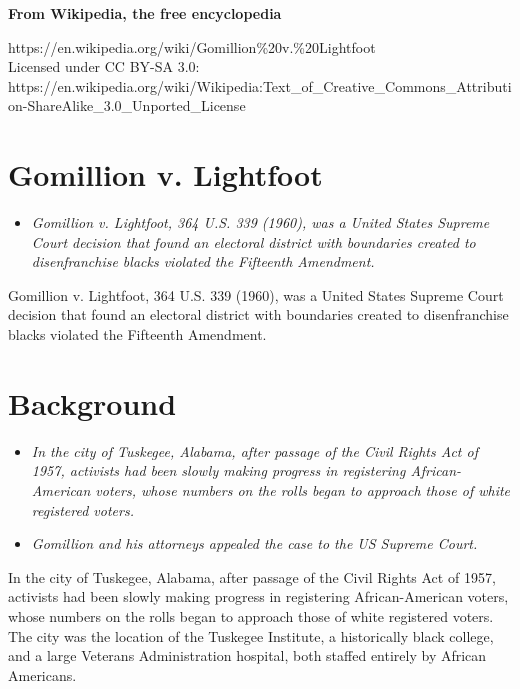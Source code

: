\textbf{From Wikipedia, the free encyclopedia}

https://en.wikipedia.org/wiki/Gomillion\%20v.\%20Lightfoot\\
Licensed under CC BY-SA 3.0:\\
https://en.wikipedia.org/wiki/Wikipedia:Text\_of\_Creative\_Commons\_Attribution-ShareAlike\_3.0\_Unported\_License

\section{Gomillion v. Lightfoot}\label{gomillion-v.-lightfoot}

\begin{itemize}
\item
  \emph{Gomillion v. Lightfoot, 364 U.S. 339 (1960), was a United States
  Supreme Court decision that found an electoral district with
  boundaries created to disenfranchise blacks violated the Fifteenth
  Amendment.}
\end{itemize}

Gomillion v. Lightfoot, 364 U.S. 339 (1960), was a United States Supreme
Court decision that found an electoral district with boundaries created
to disenfranchise blacks violated the Fifteenth Amendment.

\section{Background}\label{background}

\begin{itemize}
\item
  \emph{In the city of Tuskegee, Alabama, after passage of the Civil
  Rights Act of 1957, activists had been slowly making progress in
  registering African-American voters, whose numbers on the rolls began
  to approach those of white registered voters.}
\item
  \emph{Gomillion and his attorneys appealed the case to the US Supreme
  Court.}
\end{itemize}

In the city of Tuskegee, Alabama, after passage of the Civil Rights Act
of 1957, activists had been slowly making progress in registering
African-American voters, whose numbers on the rolls began to approach
those of white registered voters. The city was the location of the
Tuskegee Institute, a historically black college, and a large Veterans
Administration hospital, both staffed entirely by African Americans.

